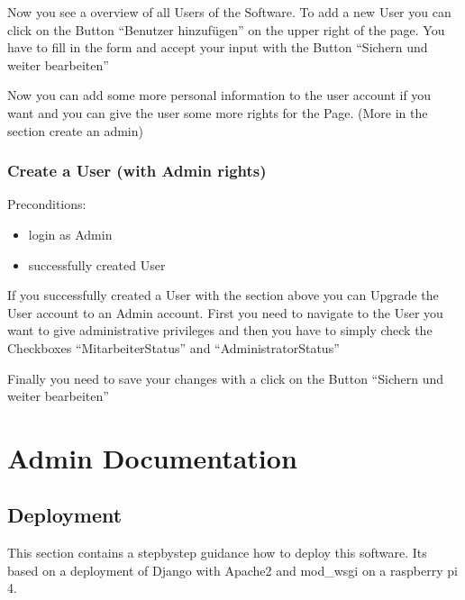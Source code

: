 \documentclass[letterpaper,10pt,english]{sphinxmanual}
\begin{document}
\noindent{}

Now you see a overview of all Users of the Software. To add a
new User you can click on the Button “Benutzer hinzufügen” on the
upper right of the page. You have to fill in the form and accept your input
with the Button “Sichern und weiter bearbeiten”

\noindent{}

Now you can add some more personal information to the user account if you want
and you can give the user some more rights for the Page. (More in the section
create an admin)

\noindent{}


\subsection{Create a User (with Admin rights)}
\label{\detokenize{masterUserDoc:create-a-user-with-admin-rights}}
Pre\sphinxhyphen{}conditions:
\begin{itemize}
\item {} 
login as Admin

\item {} 
successfully created User

\end{itemize}

If you successfully created a User with the section above you can Upgrade
the User account to an Admin account. First you need to navigate to the
User you want to give administrative privileges and then you have to simply check
the Checkboxes “Mitarbeiter\sphinxhyphen{}Status” and “Administrator\sphinxhyphen{}Status”

\noindent{}

Finally you need to save your changes with a click on the Button
“Sichern und weiter bearbeiten”


\chapter{Admin Documentation}
\label{\detokenize{masterAdminDoc:admin-documentation}}\label{\detokenize{masterAdminDoc::doc}}

\section{Deployment}
\label{\detokenize{masterAdminDoc:deployment}}
This section contains a step\sphinxhyphen{}by\sphinxhyphen{}step guidance how to deploy this software.
It\textasciigrave{}s based on a deployment of Django with Apache2 and mod\_wsgi on a raspberry pi 4.
\end{document}
